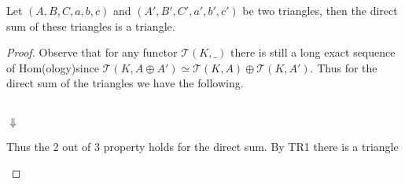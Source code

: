     \begin{lemma}
        Let $(A,B,C,a,b,c)$ and $(A',B',C',a',b',c')$ be two triangles, then the direct sum of these triangles is a triangle.
    \end{lemma}

    \begin{proof}
         Observe that for any functor $\mathcal{T}(K,\_)$ there is still a long exact sequence of Hom(ology)since $\mathcal{T}(K,A\oplus A')\simeq\mathcal{T}(K,A)\oplus\mathcal{T}(K,A')$. Thus for the direct sum of the triangles we have the following.
        \begin{center}
             \\
            $\Downarrow$ \\
        \end{center}
        Thus the 2 out of 3 property holds for the direct sum. By TR1 there is a triangle 
        \begin{center}

\end{center}
\end{proof}
